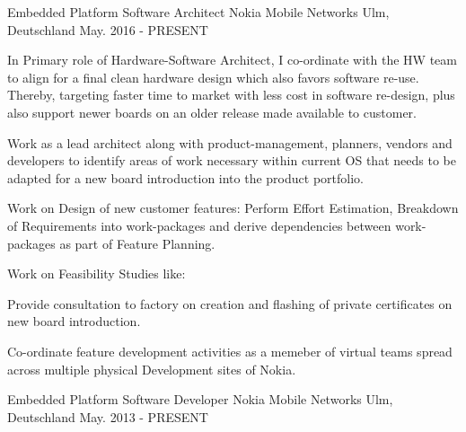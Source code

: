   \cventry
    {Embedded Platform Software Architect} %
    {Nokia Mobile Networks} %
    {Ulm, Deutschland} %
    {May. 2016 - PRESENT} %
    {%
		\begin{cvitems} %
		\item {In Primary role of Hardware-Software Architect, I co-ordinate with the HW team to align for a final clean hardware design which also favors software re-use. Thereby, targeting faster time to market with less cost in software re-design, plus also support newer boards on an older release made available to customer.}
		\item {Work as a lead architect along with product-management, planners, vendors and developers to identify areas of work necessary within current OS that needs to be adapted for a new board introduction into the product portfolio.}
		\item {Work on Design of new customer features: Perform Effort Estimation, Breakdown of Requirements into work-packages and derive dependencies between work-packages as part of Feature Planning.}
		\item {Work on Feasibility Studies like:}
		\item {Provide consultation to factory on creation and flashing of private certificates on new board introduction.}
		\item {Co-ordinate feature development activities as a memeber of virtual teams spread across multiple physical Development sites of Nokia.}
		\end{cvitems}
    }
  \cventry
    {Embedded Platform Software Developer} %
    {Nokia Mobile Networks} %
    {Ulm, Deutschland} %
    {May. 2013 - PRESENT} %
